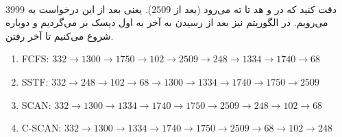 \\\noindent
دقت کنید که در
و
هد تا ته می‌رود (بعد از 2509). یعنی بعد از این درخواست به 3999 می‌رویم.
در الگوریتم
نیز بعد از رسیدن به آخر به اول دیسک بر می‌گردیم و دوباره شروع می‌کنیم تا آخر رفتن.
\begin{latin}
    \begin{enumerate}
        \item FCFS: $332 \rightarrow 1300 \rightarrow 1750 \rightarrow 102 \rightarrow 2509 \rightarrow 248 \rightarrow 1334 \rightarrow 1740 \rightarrow 68$
        \item SSTF: $332 \rightarrow 248 \rightarrow 102 \rightarrow 68 \rightarrow 1300 \rightarrow 1334 \rightarrow 1740 \rightarrow 1750 \rightarrow 2509$
        \item SCAN: $332 \rightarrow 1300 \rightarrow 1334 \rightarrow 1740 \rightarrow 1750 \rightarrow 2509 \rightarrow 248 \rightarrow 102 \rightarrow 68$
        \item C-SCAN: $332 \rightarrow 1300 \rightarrow 1334 \rightarrow 1740 \rightarrow 1750 \rightarrow 2509 \rightarrow 68 \rightarrow 102 \rightarrow 248$
    \end{enumerate}
\end{latin}